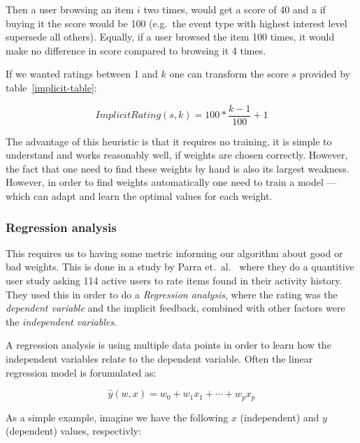
Then a user browsing an item $i$ two times, would get a score of 40  and a if
buying it the score would be 100 (e.g.\ the event type with highest interest
level supersede all others). Equally, if a user browsed the item 100 times, it
would make no difference in score compared to browsing it 4 times.

If we wanted ratings between 1 and $k$ one can transform the score $s$ provided
by table~\ref{implicit-table}:

\begin{equation}
  ImplicitRating(s, k) = 100 * \frac{k-1}{100} + 1 
\end{equation}

The advantage of this heuristic is that it requires no training, it is simple
to understand and works reasonably well, if weights are chosen correctly.
However, the fact that one need to find these weights by hand is also its
largest weakness. However, in order to find weights automatically one need to
train a model — which can adapt and learn the optimal values for each weight.

\subsubsection{Regression analysis}

This requires us to having some metric informing our algorithm about good or
bad weights. This is done in a study by Parra et.\ al.~\cite{parra2011walk}
where they do a quantitive user study asking 114 active users to rate items
found in their activity history. They used this in order to do
a \textit{Regression analysis}, where the rating was the \textit{dependent
variable} and the implicit feedback, combined with other factors were the
\textit{independent variables}.

A regression analysis is using multiple data points in order to learn how the
independent variables relate to the dependent variable. Often the linear
regression model is forumulated as:

\begin{equation}
  \label{eq-regression}
  \hat{y}(w,x) = w_0 + w_1 x_1 + \cdots + w_p x_p
\end{equation}

As a simple example, imagine we have the following $x$ (independent) and $y$
(dependent) values, respectivly:

